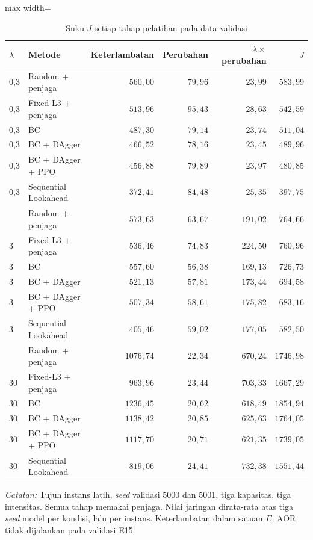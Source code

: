 \begin{table}[htbp]
\caption{Suku $J$ setiap tahap pelatihan pada data validasi}
\label{tab:validasi-tahap}
\centering\footnotesize
\setlength{\tabcolsep}{4pt}
\begin{adjustbox}{max width=\textwidth}
\begin{tabular}{llrrrr}
\toprule
$\lambda$ & Metode & Keterlambatan & Perubahan & $\lambda\times$perubahan & $J$ \\
\midrule
0{,}3 & Random + penjaga & $560{,}00$ & $79{,}96$ & $23{,}99$ & $583{,}99$ \\
0{,}3 & Fixed-L3 + penjaga & $513{,}96$ & $95{,}43$ & $28{,}63$ & $542{,}59$ \\
0{,}3 & BC & $487{,}30$ & $79{,}14$ & $23{,}74$ & $511{,}04$ \\
0{,}3 & BC + DAgger & $466{,}52$ & $78{,}16$ & $23{,}45$ & $489{,}96$ \\
0{,}3 & BC + DAgger + PPO & $456{,}88$ & $79{,}89$ & $23{,}97$ & $480{,}85$ \\
0{,}3 & Sequential Lookahead & $372{,}41$ & $84{,}48$ & $25{,}35$ & $397{,}75$ \\
\addlinespace
3 & Random + penjaga & $573{,}63$ & $63{,}67$ & $191{,}02$ & $764{,}66$ \\
3 & Fixed-L3 + penjaga & $536{,}46$ & $74{,}83$ & $224{,}50$ & $760{,}96$ \\
3 & BC & $557{,}60$ & $56{,}38$ & $169{,}13$ & $726{,}73$ \\
3 & BC + DAgger & $521{,}13$ & $57{,}81$ & $173{,}44$ & $694{,}58$ \\
3 & BC + DAgger + PPO & $507{,}34$ & $58{,}61$ & $175{,}82$ & $683{,}16$ \\
3 & Sequential Lookahead & $405{,}46$ & $59{,}02$ & $177{,}05$ & $582{,}50$ \\
\addlinespace
30 & Random + penjaga & $1076{,}74$ & $22{,}34$ & $670{,}24$ & $1746{,}98$ \\
30 & Fixed-L3 + penjaga & $963{,}96$ & $23{,}44$ & $703{,}33$ & $1667{,}29$ \\
30 & BC & $1236{,}45$ & $20{,}62$ & $618{,}49$ & $1854{,}94$ \\
30 & BC + DAgger & $1138{,}42$ & $20{,}85$ & $625{,}63$ & $1764{,}05$ \\
30 & BC + DAgger + PPO & $1117{,}70$ & $20{,}71$ & $621{,}35$ & $1739{,}05$ \\
30 & Sequential Lookahead & $819{,}06$ & $24{,}41$ & $732{,}38$ & $1551{,}44$ \\
\bottomrule
\end{tabular}
\end{adjustbox}
\par\smallskip\footnotesize\textit{Catatan:} Tujuh instans latih, \emph{seed} validasi 5000 dan 5001, tiga kapasitas, tiga intensitas. Semua tahap memakai penjaga. Nilai jaringan dirata-rata atas tiga \emph{seed} model per kondisi, lalu per instans. Keterlambatan dalam satuan $E$. AOR tidak dijalankan pada validasi E15.
\end{table}
